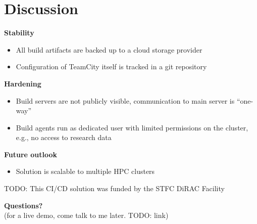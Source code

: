 \documentclass[english,xcolor=pst,11pt]{beamer}
\begin{document}
\section{Discussion}
\begin{frame}
 \textbf{Stability}
 \begin{itemize}
  \item All build artifacts are backed up to a cloud storage provider
  \item Configuration of TeamCity itself is tracked in a git repository
  \end{itemize}
  \textbf{Hardening}
  \begin{itemize}
  \item Build servers are not publicly visible, communication to main server is ``one-way''
  \item Build agents run as dedicated  user with limited permissions on the cluster, e.g., no access to research data
 \end{itemize}
 \textbf{Future outlook}

 \begin{itemize}
  \item Solution is scalable to multiple HPC clusters
 \end{itemize}
TODO: This CI/CD solution was funded by the STFC DiRAC Facility
\end{frame}


\begin{frame}
 \Large{\textbf{Questions?}} \\ \vfill
 \small{(for a live demo, come talk to me later. TODO: link)}
\end{frame}
\end{document}
